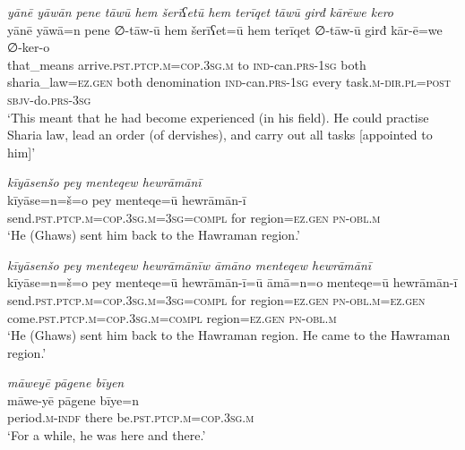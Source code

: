 \ea \label{ZP.19}
\textit{yānē yāwān pene tāwū hem šerīʕetū hem terīqet tāwū girđ kārēwe kero} \\ 
\gll yānē yāwā=n pene ∅-tāw-ū hem šerīʕet=ū hem terīqet ∅-tāw-ū girđ kār-ē=we ∅-ker-o \\ 
 that\_means arrive\textsc{.pst}\textsc{.ptcp}\textsc{.m}\textsc{=cop}\textsc{.3sg}\textsc{.m} to \textsc{ind-}can\textsc{.prs}\textsc{-\textsc{1sg}} both sharia\_law\textsc{\textsc{=ez.gen}} both denomination \textsc{ind-}can\textsc{.prs}\textsc{-\textsc{1sg}} every task\textsc{.m}\textsc{-dir}\textsc{.pl}\textsc{=\textsc{post}} \textsc{sbjv-}do\textsc{.prs}\textsc{-3sg} \\ 
\glt `This meant that he had become experienced (in his field). He could practise Sharia law, lead an order (of dervishes), and carry out all tasks [appointed to him]'
\z 
 
\ea \label{ZP.20}
\textit{kīyāsenšo pey menteqew hewrāmānī} \\ 
\gll kīyāse=n=š=o pey menteqe=ū hewrāmān-ī \\ 
 send\textsc{.pst}\textsc{.ptcp}\textsc{.m}\textsc{=cop}\textsc{.3sg}\textsc{.m}\textsc{=3sg}\textsc{=compl} for region\textsc{\textsc{=ez.gen}} \textsc{pn}\textsc{-obl}\textsc{.m} \\ 
\glt `He (Ghaws) sent him back to the Hawraman region.'
\z 
 
\ea \label{ZP.21}
\textit{kīyāsenšo pey menteqew hewrāmānīw āmāno menteqew hewrāmānī} \\ 
\gll kīyāse=n=š=o pey menteqe=ū hewrāmān-ī=ū āmā=n=o menteqe=ū hewrāmān-ī \\ 
 send\textsc{.pst}\textsc{.ptcp}\textsc{.m}\textsc{=cop}\textsc{.3sg}\textsc{.m}\textsc{=3sg}\textsc{=compl} for region\textsc{\textsc{=ez.gen}} \textsc{pn}\textsc{-obl}\textsc{.m}\textsc{\textsc{=ez.gen}} come\textsc{.pst}\textsc{.ptcp}\textsc{.m}\textsc{=cop}\textsc{.3sg}\textsc{.m}\textsc{=compl} region\textsc{\textsc{=ez.gen}} \textsc{pn}\textsc{-obl}\textsc{.m} \\ 
\glt `He (Ghaws) sent him back to the Hawraman region. He came to the Hawraman region.'
\z 
 
\ea \label{ZP.22}
\textit{māweyē pāgene bīyen} \\ 
\gll māwe-yē pāgene bīye=n \\ 
 period\textsc{.m}\textsc{-indf} there be\textsc{.pst}\textsc{.ptcp}\textsc{.m}\textsc{=cop}\textsc{.3sg}\textsc{.m} \\ 
\glt `For a while, he was here and there.'
\z 
 
